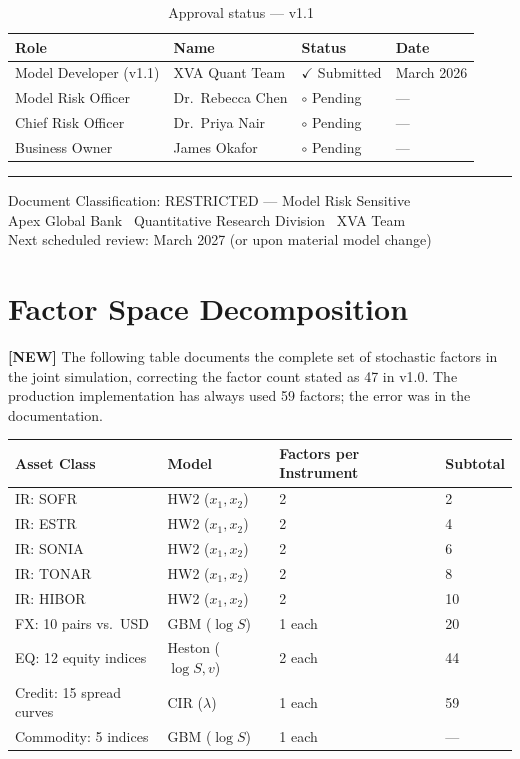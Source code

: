 \documentclass[11pt,a4paper]{article}
\begin{document}
\begin{table}[h!]
\centering
\begin{tabular}{@{}llll@{}}
\toprule
\textbf{Role} & \textbf{Name} & \textbf{Status} & \textbf{Date} \\
\midrule
Model Developer (v1.1)   & XVA Quant Team      & $\checkmark$ Submitted & March 2026 \\
Model Risk Officer       & Dr.\ Rebecca Chen   & $\circ$ Pending & --- \\
Chief Risk Officer       & Dr.\ Priya Nair     & $\circ$ Pending & --- \\
Business Owner           & James Okafor        & $\circ$ Pending & --- \\
\bottomrule
\end{tabular}
\caption{Approval status --- v1.1}
\end{table}

\vspace{2em}
\hrule
\vspace{0.5em}
{\small\color{apexgray}
Document Classification: RESTRICTED --- Model Risk Sensitive\\
Apex Global Bank \textbar\ Quantitative Research Division \textbar\ XVA Team\\
Next scheduled review: March 2027 (or upon material model change)
}

\appendix
\section{Factor Space Decomposition}
\label{app:factors}

\textbf{[NEW]} The following table documents the complete set of stochastic
factors in the joint simulation, correcting the factor count stated as 47
in v1.0. The production implementation has always used 59 factors; the error
was in the documentation.

\begin{longtable}{@{}llll@{}}
\toprule
\textbf{Asset Class} & \textbf{Model} & \textbf{Factors per Instrument} & \textbf{Subtotal} \\
\midrule
\endhead
\bottomrule
\endfoot
IR: SOFR  & HW2 ($x_1, x_2$) & 2 & 2 \\
IR: ESTR  & HW2 ($x_1, x_2$) & 2 & 4 \\
IR: SONIA & HW2 ($x_1, x_2$) & 2 & 6 \\
IR: TONAR & HW2 ($x_1, x_2$) & 2 & 8 \\
IR: HIBOR & HW2 ($x_1, x_2$) & 2 & 10 \\
FX: 10 pairs vs.\ USD & GBM ($\log S$) & 1 each & 20 \\
EQ: 12 equity indices & Heston ($\log S, v$) & 2 each & 44 \\
Credit: 15 spread curves & CIR ($\lambda$) & 1 each & 59 \\
Commodity: 5 indices & GBM ($\log S$) & 1 each & --- \\
\bottomrule
\end{longtable}
\end{document}
